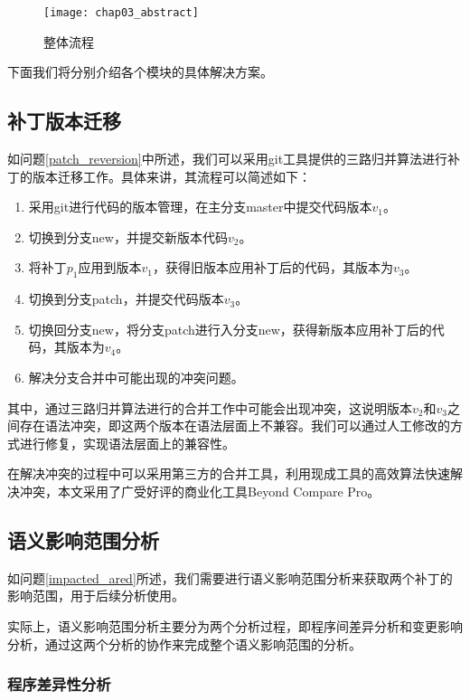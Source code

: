 \begin{figure}[H]
	\centering
	\texttt{[image: chap03\_abstract]}
	\caption {整体流程}
	\label {all_flow}	
\end{figure}

下面我们将分别介绍各个模块的具体解决方案。

\subsection{补丁版本迁移}

如问题\ref {patch_reversion}中所述，我们可以采用git工具提供的三路归并算法进行补丁的版本迁移工作。具体来讲，其流程可以简述如下：
\begin{enumerate}
	\item 采用git进行代码的版本管理，在主分支master中提交代码版本$v_1$。
	\item 切换到分支new，并提交新版本代码$v_2$。
	\item 将补丁$p_1$应用到版本$v_1$，获得旧版本应用补丁后的代码，其版本为$v_3$。
	\item 切换到分支patch，并提交代码版本$v_3$。
	\item 切换回分支new，将分支patch进行入分支new，获得新版本应用补丁后的代码，其版本为$v_4$。
	\item 解决分支合并中可能出现的冲突问题。
\end{enumerate}

其中，通过三路归并算法进行的合并工作中可能会出现冲突，这说明版本$v_2$和$v_3$之间存在语法冲突，即这两个版本在语法层面上不兼容。我们可以通过人工修改的方式进行修复，实现语法层面上的兼容性。

在解决冲突的过程中可以采用第三方的合并工具，利用现成工具的高效算法快速解决冲突，本文采用了广受好评的商业化工具Beyond Compare Pro。

\subsection{语义影响范围分析}

如问题\ref {impacted_ared}所述，我们需要进行语义影响范围分析来获取两个补丁的影响范围，用于后续分析使用。

实际上，语义影响范围分析主要分为两个分析过程，即程序间差异分析和变更影响分析，通过这两个分析的协作来完成整个语义影响范围的分析。

\subsubsection{程序差异性分析}


